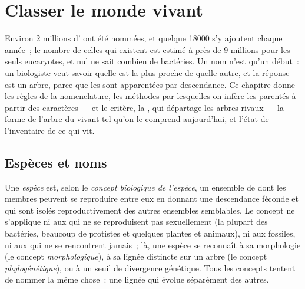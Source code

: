 \chapter{Classer le monde vivant}\label{ch:b1:classifying-biodiversity}

Environ \num{2} millions d' ont été nommées, et quelque
\num{18000} s'y ajoutent chaque année~; le nombre de celles qui existent
est estimé à près de \num{9} millions pour les seuls eucaryotes, et
nul ne sait combien de bactéries. Un nom n'est qu'un début~: un
biologiste veut savoir quelle  est la plus proche de quelle
autre, et la réponse est un arbre, parce que les  sont
apparentées par descendance. Ce chapitre donne les règles de la
nomenclature, les méthodes par lesquelles on infère les parentés à
partir des caractères --- et le critère, la , qui départage
les arbres rivaux --- la forme de l'arbre du vivant tel qu'on le
comprend aujourd'hui, et l'état de l'inventaire de ce qui vit.

\section{Espèces et noms}

\begin{definition}[Espèce]\label{def:b1:classifying-biodiversity:species}
Une \emph{espèce} est, selon le \emph{concept biologique de l'espèce},
un ensemble de  dont les membres peuvent se reproduire entre
eux en donnant une descendance féconde et qui sont isolés
reproductivement des autres ensembles semblables. Le concept ne
s'applique ni aux  qui ne se reproduisent pas sexuellement
(la plupart des bactéries, beaucoup de protistes et quelques plantes et
animaux), ni aux fossiles, ni aux  qui ne se rencontrent
jamais~; là, une espèce se reconnaît à sa morphologie (le concept
\emph{morphologique}), à sa lignée distincte sur un arbre (le concept
\emph{phylogénétique}), ou à un seuil de divergence génétique. Tous les
concepts tentent de nommer la même chose~: une lignée qui évolue
séparément des autres.
\end{definition}

